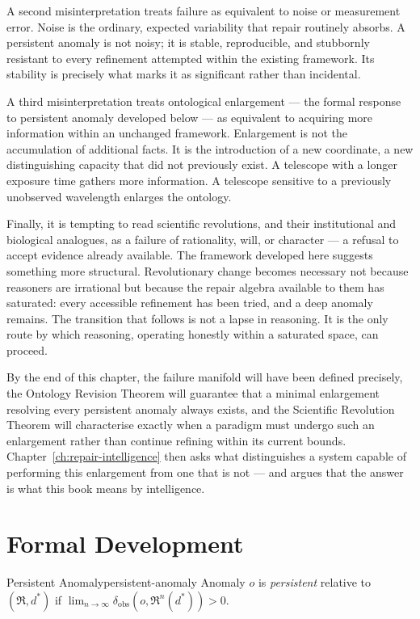 \documentclass[12pt,twoside,openright]{book}
\newcommand{\repair}{\mathfrak{R}}
\begin{document}
A second misinterpretation treats failure as equivalent to
noise or measurement error. Noise is the ordinary, expected
variability that repair routinely absorbs. A persistent
anomaly is not noisy; it is stable, reproducible, and
stubbornly resistant to every refinement attempted within
the existing framework. Its stability is precisely what
marks it as significant rather than incidental.

A third misinterpretation treats ontological enlargement ---
the formal response to persistent anomaly developed below
--- as equivalent to acquiring more information within an
unchanged framework. Enlargement is not the accumulation of
additional facts. It is the introduction of a new
coordinate, a new distinguishing capacity that did not
previously exist. A telescope with a longer exposure time
gathers more information. A telescope sensitive to a
previously unobserved wavelength enlarges the ontology.

Finally, it is tempting to read scientific revolutions, and
their institutional and biological analogues, as a failure
of rationality, will, or character --- a refusal to accept
evidence already available. The framework developed here
suggests something more structural. Revolutionary change
becomes necessary not because reasoners are irrational but
because the repair algebra available to them has saturated:
every accessible refinement has been tried, and a deep
anomaly remains. The transition that follows is not a lapse
in reasoning. It is the only route by which reasoning,
operating honestly within a saturated space, can proceed.

By the end of this chapter, the failure manifold will have
been defined precisely, the Ontology Revision Theorem will
guarantee that a minimal enlargement resolving every
persistent anomaly always exists, and the Scientific
Revolution Theorem will characterise exactly when a paradigm
must undergo such an enlargement rather than continue
refining within its current bounds.
Chapter~\ref{ch:repair-intelligence} then asks what
distinguishes a system capable of performing this
enlargement from one that is not --- and argues that the
answer is what this book means by intelligence.

\section{Formal Development}
\label{sec:ch8-formal}

\begin{definition}{Persistent Anomaly}{persistent-anomaly}
  Anomaly $o$ is \emph{persistent} relative to
  $(\repair,d^*)$ if
  $\lim_{n\to\infty}\delta_\mathrm{obs}(o,\repair^n(d^*))>0$.
\end{definition}
\end{document}
